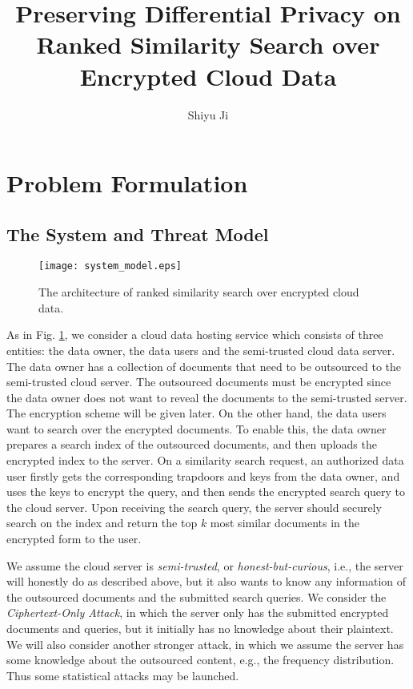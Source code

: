 \documentclass{IEEEtran}
\begin{document}
\title{Preserving Differential Privacy on Ranked Similarity Search over Encrypted Cloud Data}
\author{
Shiyu Ji}
\maketitle

\newtheorem{definition}{Definition}
\theoremstyle{definition}
\newtheorem{theorem}{Theorem}
\theoremstyle{plain}
\newtheorem{lemma}{Lemma}
\theoremstyle{plain}
\newtheorem{corollary}{Corollary}
\theoremstyle{plain}

\section{Problem Formulation}
\subsection{The System and Threat Model}

\begin{figure}
\centering
\texttt{[image: system\_model.eps]}
\caption{The architecture of ranked similarity search over encrypted cloud data.}
\label{fig:system_model}
\end{figure}

As in Fig. \ref{fig:system_model}, we consider a cloud data hosting service which consists of three entities: the data owner, the data users and the semi-trusted cloud data server. The data owner has a collection of documents that need to be outsourced to the semi-trusted cloud server. The outsourced documents must be encrypted since the data owner does not want to reveal the documents to the semi-trusted server. The encryption scheme will be given later. On the other hand, the data users want to search over the encrypted documents. To enable this, the data owner prepares a search index of the outsourced documents, and then uploads the encrypted index to the server. On a similarity search request, an authorized data user firstly gets the corresponding trapdoors and keys from the data owner, and uses the keys to encrypt the query, and then sends the encrypted search query to the cloud server. Upon receiving the search query, the server should securely search on the index and return the top $k$ most similar documents in the encrypted form to the user.

We assume the cloud server is \emph{semi-trusted}, or \emph{honest-but-curious}, i.e., the server will honestly do as described above, but it also wants to know any information of the outsourced documents and the submitted search queries. We consider the \emph{Ciphertext-Only Attack}, in which the server only has the submitted encrypted documents and queries, but it initially has no knowledge about their plaintext. We will also consider another stronger attack, in which we assume the server has some knowledge about the outsourced content, e.g., the frequency distribution. Thus some statistical attacks may be launched.
\end{document}
